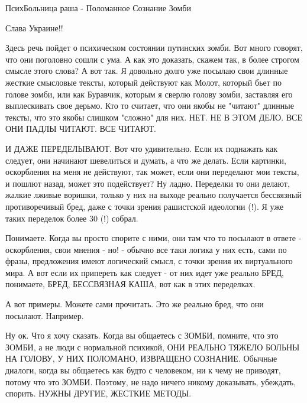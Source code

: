  
 
 
 
 

ПсихБольница раша - Поломанное Сознание Зомби

Слава Украине!!

Здесь речь пойдет о психическом состоянии путинских зомби. Вот много говорят,
что они поголовно сошли с ума. А как это доказать, скажем так, в более строгом
смысле этого слова? А вот так. Я довольно долго уже посылаю свои длинные
жесткие смысловые тексты, который действуют как Молот, который бьет по голове
зомби, или как Буравчик, которым я сверлю голову зомби, заставляя его
выплескивать свое дерьмо. Кто то считает, что они якобы не "читают" длинные
тексты, что это якобы слишком "сложно" для них.  НЕТ. НЕ В ЭТОМ ДЕЛО. ВСЕ ОНИ
ПАДЛЫ ЧИТАЮТ. ВСЕ ЧИТАЮТ.

И ДАЖЕ ПЕРЕДЕЛЫВАЮТ. Вот что удивительно. Если их поднажать как следует, они
начинают шевелиться и думать, а что же делать. Если картинки, оскорбления на
меня не действуют, так может, если они переделают мои тексты, и пошлют назад,
может это подействует? Ну ладно.  Переделки то они делают, жалкие лживые
воришки, только у них на выходе реально получается бессвязный противоречивый
бред, даже с точки зрения рашистской идеологии (!). Я уже таких переделок более
30 (!) собрал.

Понимаете. Когда вы просто спорите с ними, они там что то посылают в ответе -
оскорбления, свои мнения - но! - обычно все таки логика у них есть, сами по
фразы, предложения имеют логический смысл, с точки зрения их виртуального мира.
А вот если их припереть как следует - от них идет уже реально БРЕД, понимаете,
БРЕД, БЕССВЯЗНАЯ КАША, вот как в этих переделках.

А вот примеры. Можете сами прочитать. Это же реально бред, что они посылают.
Например. 

Ну ок. Что я хочу сказать. Когда вы общаетесь с ЗОМБИ, помните, что это ЗОМБИ,
а не люди с нормальной психикой, ОНИ РЕАЛЬНО ТЯЖЕЛО БОЛЬНЫ НА ГОЛОВУ, У НИХ
ПОЛОМАНО, ИЗВРАЩЕНО СОЗНАНИЕ. Обычные диалоги, когда вы общаетесь как будто с
человеком, ни к чему не приводят, потому что это ЗОМБИ. Поэтому, не надо ничего
никому доказывать, убеждать, спорить. НУЖНЫ ДРУГИЕ, ЖЕСТКИЕ МЕТОДЫ.
